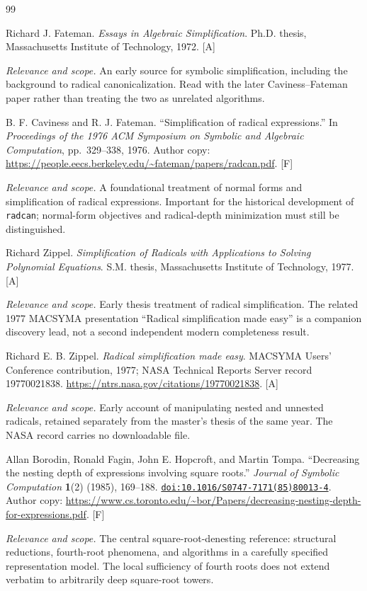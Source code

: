 \documentclass[11pt,oneside]{article}
\numberwithin{equation}{section}
\theoremstyle{definition}
\theoremstyle{remark}
\newcommand{\doi}[1]{\href{https://doi.org/#1}{\nolinkurl{doi:#1}}}
\newcommand{\status}[1]{\textsf{\small[#1]}}
\newcommand{\entrynote}[1]{\par\smallskip\noindent\emph{Relevance and scope.} #1}
\begin{document}
\begin{thebibliography}{99}
\setlength{\itemsep}{3pt}

Richard J. Fateman. \emph{Essays in Algebraic Simplification}. Ph.D. thesis, Massachusetts Institute of Technology, 1972. \status{A}
\entrynote{An early source for symbolic simplification, including the background to radical canonicalization. Read with the later Caviness--Fateman paper rather than treating the two as unrelated algorithms.}

B. F. Caviness and R. J. Fateman. ``Simplification of radical expressions.'' In \emph{Proceedings of the 1976 ACM Symposium on Symbolic and Algebraic Computation}, pp.~329--338, 1976. Author copy: \url{https://people.eecs.berkeley.edu/~fateman/papers/radcan.pdf}. \status{F}
\entrynote{A foundational treatment of normal forms and simplification of radical expressions. Important for the historical development of \texttt{radcan}; normal-form objectives and radical-depth minimization must still be distinguished.}

Richard Zippel. \emph{Simplification of Radicals with Applications to Solving Polynomial Equations}. S.M. thesis, Massachusetts Institute of Technology, 1977. \status{A}
\entrynote{Early thesis treatment of radical simplification. The related 1977 MACSYMA presentation ``Radical simplification made easy'' is a companion discovery lead, not a second independent modern completeness result.}

Richard E. B. Zippel. \emph{Radical simplification made easy}. MACSYMA Users' Conference contribution, 1977; NASA Technical Reports Server record 19770021838. \url{https://ntrs.nasa.gov/citations/19770021838}. \status{A}
\entrynote{Early account of manipulating nested and unnested radicals, retained separately from the master's thesis of the same year. The NASA record carries no downloadable file.}

Allan Borodin, Ronald Fagin, John E. Hopcroft, and Martin Tompa. ``Decreasing the nesting depth of expressions involving square roots.'' \emph{Journal of Symbolic Computation} \textbf{1}(2) (1985), 169--188. \doi{10.1016/S0747-7171(85)80013-4}. Author copy: \url{https://www.cs.toronto.edu/~bor/Papers/decreasing-nesting-depth-for-expressions.pdf}. \status{F}
\entrynote{The central square-root-denesting reference: structural reductions, fourth-root phenomena, and algorithms in a carefully specified representation model. The local sufficiency of fourth roots does not extend verbatim to arbitrarily deep square-root towers.}


\end{thebibliography}
\end{document}
